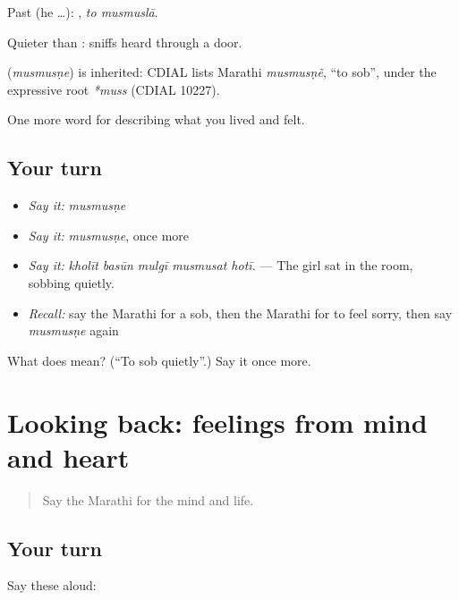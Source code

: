 Past (he …):  , \emph{to musmuslā}.

Quieter than : sniffs heard through a door.

\begin{cousinweb}
\textbf{} (\emph{musmusṇe}) is inherited: CDIAL lists Marathi \emph{musmusṇẽ}, \textquotedblleft{}to sob\textquotedblright{}, under the expressive root \emph{*muss} (CDIAL 10227).
\end{cousinweb}

\begin{grammarlens}[title={What you've built}]
One more word for describing what you lived and felt.
\end{grammarlens}

\subsection*{Your turn}
\begin{itemize}
\raggedright
  \item \emph{Say it:} \emph{musmusṇe}
  \item \emph{Say it:} \emph{musmusṇe}, once more
  \item \emph{Say it:} \emph{kholīt basūn mulgī musmusat hotī.} — The girl sat in the room, sobbing quietly.
  \item \emph{Recall:} say the Marathi for a sob, then the Marathi for to feel sorry, then say \emph{musmusṇe} again
\end{itemize}

\begin{tcolorbox}[breakable,colback=teal!4,colframe=teal!35!black,title={Before you move on}]
What does  mean? (\textquotedblleft{}To sob quietly\textquotedblright{}.) Say it once more.
\end{tcolorbox}
\section[(dialogue)]{Looking back: feelings from mind and heart}

\label{lesson:MR-R457-review-450-457}



\begin{quote}
Say the Marathi for the mind and life.
\end{quote}

\subsection*{Your turn}
Say these aloud:

